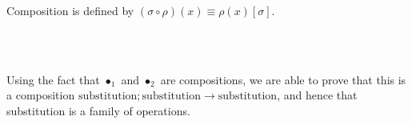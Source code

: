 
Composition is defined by $(\sigma \circ \rho)(x) \equiv \rho(x) [ \sigma ]$.

\begin{code}%
\>  \<%
\\
\> \AgdaSymbol{:}  \AgdaSymbol{\{}\AgdaSymbol{\}} \AgdaSymbol{\{}\AgdaSymbol{\}} \AgdaSymbol{\{}\AgdaSymbol{\}}            \<%
\\
\>\AgdaSymbol{(}  \AgdaSymbol{)}   \AgdaSymbol{=}      \<%
\end{code}

Using the fact that $\bullet_1$ and $\bullet_2$ are compositions, we are
able to prove that this is a composition $\mathrm{substitution} ; \mathrm{substitution} \rightarrow \mathrm{substitution}$, and hence that substitution is a family of operations.

\begin{code}%
\> \AgdaSymbol{:}  \AgdaSymbol{\{}\AgdaSymbol{\}} \AgdaSymbol{\{}\AgdaSymbol{\}} \AgdaSymbol{\{}\AgdaSymbol{\}} \AgdaSymbol{\{} \AgdaSymbol{:}   \AgdaSymbol{\}} \AgdaSymbol{\{} \AgdaSymbol{:}   \AgdaSymbol{\}} \AgdaSymbol{\{}\AgdaSymbol{\}}  \<[63]%
\>[63]\<%
\\
\>[0]\<[2]%
\>[2]  \AgdaSymbol{(}  \AgdaSymbol{)}        \<%
\end{code}


